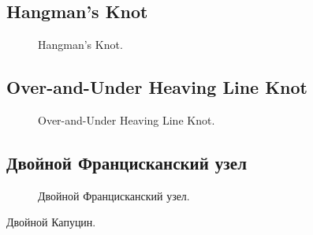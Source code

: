 \subsection{Hangman’s Knot}

\begin{figure}[H]\centering
	\begin{minipage}{1\linewidth}
		\begin{center}
			\tcbox[enhanced jigsaw,colframe=black,opacityframe=0.5,opacityback=0.5]
			{\centering{}}
		\end{center}
	\end{minipage}
\caption{Hangman’s Knot.}
	\label{ris:Hangman_Knot}
\end{figure}

\subsection{Over-and-Under Heaving Line Knot}

\begin{figure}[H]\centering
	\begin{minipage}{1\linewidth}
		\begin{center}
			\tcbox[enhanced jigsaw,colframe=black,opacityframe=0.5,opacityback=0.5]
			{\centering{}}
		\end{center}
	\end{minipage}
\caption{Over-and-Under Heaving Line Knot.}
	\label{ris:Over-and-Under}
\end{figure}

\subsection{Двойной Францисканский узел}

\begin{figure}[H]\centering
	\begin{minipage}{1\linewidth}
		\begin{center}
			\tcbox[enhanced jigsaw,colframe=black,opacityframe=0.5,opacityback=0.5]
			{\centering{}}
		\end{center}
	\end{minipage}
\caption{Двойной Францисканский узел.}
	\label{ris:Double_Francisk}
\end{figure}

Двойной Капуцин.

